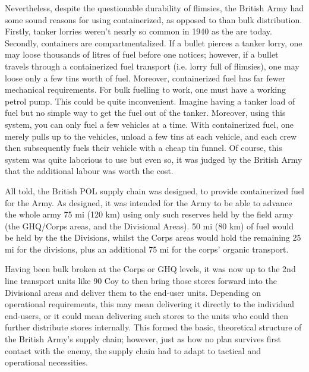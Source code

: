 \documentclass[noraggedright]{turabian-researchpaper}
\newcommand{\SupInWar}{Precis on Lecture ``Supplies in War'', (Part II)}
\begin{document}

Nevertheless, despite the questionable durability of flimsies, the British 
Army had some sound reasons for using containerized, as opposed to than bulk 
distribution.  Firstly, tanker lorries weren't nearly so common in 1940 as the 
are today.  Secondly,
containers are compartmentalized.  If a bullet pierces a tanker lorry, one may
loose thousands of litres of fuel before one notices; however, if a bullet 
travels through a containerized fuel transport (i.e. lorry full of flimsies),
one may loose only a few tins worth of fuel.  Moreover, containerized fuel has
far fewer mechanical requirements.  For bulk fuelling to work, one must have a 
working petrol pump.  This could be quite inconvenient.  Imagine having a 
tanker load of fuel but no simple way to get the fuel out of the tanker.  
Moreover, using this system, you can only fuel a few vehicles at a time.  
With containerized fuel, one merely pulls up to the vehicles, unload a few
tins at each vehicle, and each crew then subsequently fuels their vehicle
with a cheap tin funnel.  Of course, this system was quite laborious to 
use but even so, it was judged by the British Army that the additional labour
was worth the cost.  %

All told, the British POL supply chain was designed, to provide containerized
fuel for the Army.  As designed, it was intended for the Army to be able to
advance the whole army 75 mi (120 km) using only such reserves held by the 
field army (the GHQ/Corps areas, and the Divisional Areas).  50 mi (80 km) 
of fuel would be held by the the Divisions, whilst the Corps areas would hold
the remaining 25 mi for the divisions, plus an additional 75 mi for the corps'
organic transport.\autocite[\SupInWar][3]{27course}

Having been bulk broken at the Corps or GHQ levels, it was now up to the 2nd
line transport units like 90 Coy to then bring those stores forward into the
Divisional areas and deliver them to the end-user units.  Depending on 
operational requirements, this may mean delivering it directly to the 
individual end-users, or it could mean delivering such stores to the units who 
could then further distribute stores internally.  This formed the basic, 
theoretical structure of the British Army's supply chain; however, just as how
no plan survives first contact with the enemy, the supply chain had to adapt
to tactical and operational necessities.  
\end{document}
